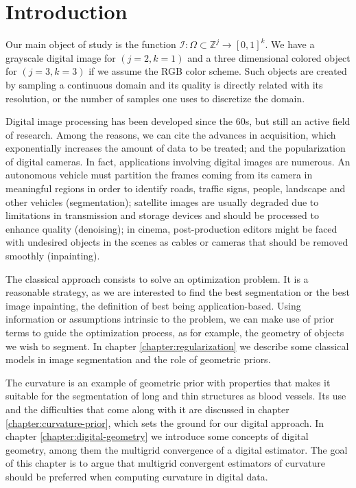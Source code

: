 \chapter{Introduction}\label{chapter:introduction}
Our main object of study is the function $\mathcal{I}:\Omega \subset \mathbb{Z}^j \rightarrow [0,1]^k$. We have a grayscale digital image for $(j=2,k=1)$ and a three dimensional colored object for $(j=3,k=3)$ if we assume the RGB color scheme. Such objects are created by sampling a continuous domain and its quality is directly related with its resolution, or the number of samples one uses to discretize the domain. 

Digital image processing has been developed since the 60s, but still an active field of research. Among the reasons, we can cite the advances in acquisition, which exponentially increases the amount of data to be treated; and the popularization of digital cameras. In fact, applications involving digital images are numerous. An autonomous vehicle must partition the frames coming from its camera in meaningful regions in order to identify roads, traffic signs, people, landscape and other vehicles (segmentation); satellite images are usually degraded due to limitations in transmission and storage devices and should be processed to enhance quality (denoising); in cinema, post-production editors might be faced with undesired objects in the scenes as cables or cameras that should be removed smoothly (inpainting). 

The classical approach consists to solve an optimization problem. It is a reasonable strategy, as we are interested to find the best segmentation or the best image inpainting, the definition of best being application-based. Using information or assumptions intrinsic to the problem, we can make use of prior terms to guide the optimization process, as for example, the geometry of objects we wish to segment. In chapter \ref{chapter:regularization} we describe some classical models in image segmentation and the role of geometric priors.

The curvature is an example of geometric prior with properties that makes it suitable for the segmentation of long and thin structures as blood vessels. Its use and the difficulties that come along with it are discussed in chapter \ref{chapter:curvature-prior}, which sets the ground for our digital approach. In chapter \ref{chapter:digital-geometry} we introduce some concepts of digital geometry, among them the multigrid convergence of a digital estimator. The goal of this chapter is to argue that multigrid convergent estimators of curvature should be preferred when computing curvature in digital data. 

